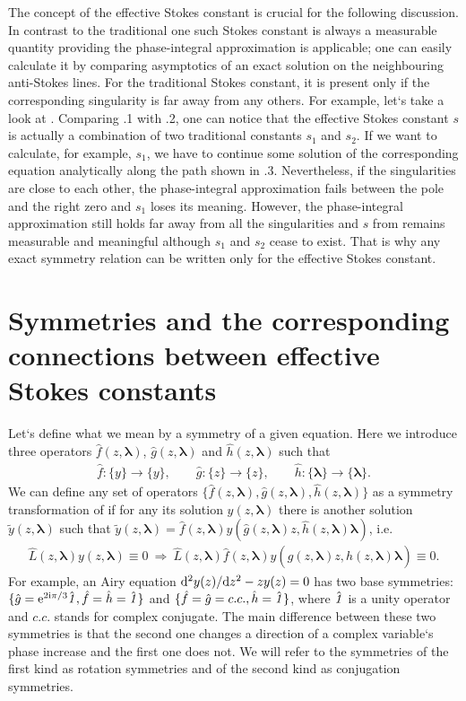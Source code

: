 \documentclass[12pt]{iopart}
\def\f{\hat{f}}
\def\g{\hat{g}}
\def\h{\hat{h}}
\def\L{\widehat{L}}
\def\lmbd{\bm{\lambda}}
\def\unity{\hat{\it 1}}
\begin{document}
The concept of the effective Stokes constant is crucial for the following discussion. 
In contrast to the traditional one such Stokes constant is always a measurable quantity
providing the phase-integral approximation is applicable; one 
can easily calculate it by comparing asymptotics of an exact solution on the 
neighbouring anti-Stokes lines. For the traditional Stokes constant, it is present only if the
corresponding singularity is far away from any others. 
For example, let`s take a look at . Comparing .1 with .2,
one can notice that the effective Stokes constant $s$ is actually a combination of
two traditional constants $s_1$ and $s_2$. If we want to calculate, for example, $s_1$, we have to continue 
some solution of the corresponding equation analytically along the path shown in  .3. Nevertheless,
if the singularities are close to each other, the phase-integral approximation fails between the pole
and the right zero and $s_1$ loses its meaning. However, the phase-integral approximation still holds
far away from all the singularities and $s$ from  remains measurable and meaningful
although $s_1$ and $s_2$ cease to exist. That is why any exact symmetry relation can be written only 
for the effective Stokes constant.

\section{Symmetries and the corresponding connections between effective Stokes constants \label{sec:smmtrs}}
Let`s define what we mean by a symmetry of a given equation. Here we introduce three operators
$\f(z,\lmbd)$, $\g(z,\lmbd)$ and $\h(z,\lmbd)$ such that
\begin{eqnarray}
\f:\{y\} \rightarrow \{y\}, \qquad
\g:\{z\} \rightarrow \{z\}, \qquad
\h:\{\lmbd\} \rightarrow \{\lmbd\}.
\end{eqnarray}
We can define any set of operators $\{\f(z,\lmbd),\g(z,\lmbd),\h(z,\lmbd)\}$ as a symmetry 
transformation of 
if for any its solution $y(z,\lmbd)$ there is another solution $\tilde{y}(z,\lmbd)$ such that
$\tilde{y}(z,\lmbd)=\f(z,\lmbd)y(\g(z,\lmbd)z,\h(z,\lmbd)\lmbd)$, i.e.
\begin{eqnarray}
\L(z,\lmbd)y(z,\lmbd) \equiv 0 \ \Longrightarrow\  
\L(z,\lmbd)\f(z,\lmbd)y(\g(z,\lmbd)z,\h(z,\lmbd)\lmbd) \equiv 0.   \label{eq:symdef}
\end{eqnarray}
For example, an Airy equation $\mathrm{d}^2 y(z)/\mathrm{d} z^2 - z y(z) = 0$ has two base symmetries: 
$\{\g=\rme^{2 \rmi \pi/3}\unity,\f=\h=\unity\}$ and $\{\f=\g=c.c.,\h=\unity\}$, where $\unity$ 
is a unity operator and $c.c.$ stands 
for complex conjugate. The main difference between these two symmetries is that the second 
one changes a direction of a complex variable`s phase increase and the first one does not. 
We will refer to the symmetries of the first kind as rotation symmetries and of the second 
kind as conjugation symmetries.
\end{document}
